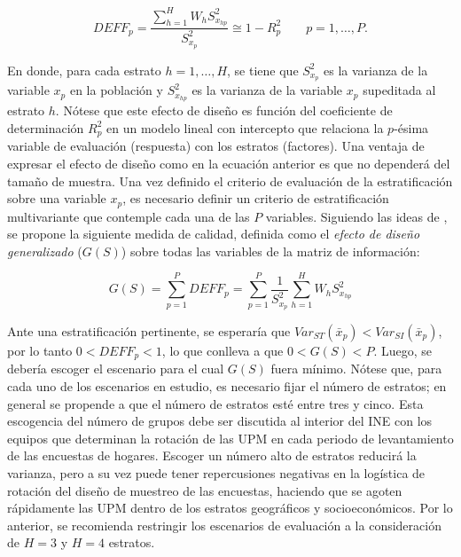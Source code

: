 \documentclass[
  12pt,
  spanish,
]{book}
\begin{document}
\[
DEFF_p = \frac{ \sum_{h=1}^H W_h S^2_{x_{hp}} }{S^2_{x_p}} \cong 1 - R^2_p \ \ \ \ \ \ \ \ \ p = 1, \ldots, P.
\]

En donde, para cada estrato \(h = 1, \ldots, H\), se tiene que \(S^2_{x_p}\) es la varianza de la variable \(x_p\) en la población y \(S^2_{x_{hp}}\) es la varianza de la variable \(x_p\) supeditada al estrato \(h\). Nótese que este efecto de diseño es función del coeficiente de determinación \(R^2_p\) en un modelo lineal con intercepto que relaciona la \(p\)-ésima variable de evaluación (respuesta) con los estratos (factores). Una ventaja de expresar el efecto de diseño como en la ecuación anterior es que no dependerá del tamaño de muestra. Una vez definido el criterio de evaluación de la estratificación sobre una variable \(x_p\), es necesario definir un criterio de estratificación multivariante que contemple cada una de las \(P\) variables. Siguiendo las ideas de \citet{Jarque_1981}, se propone la siguiente medida de calidad, definida como el \emph{efecto de diseño generalizado} (\(G(S)\)) sobre todas las variables de la matriz de información:

\[
G(S) = \sum_{p=1}^P DEFF_p = \sum_{p=1}^P \frac{1}{S^2_{x_p}}\sum_{h=1}^H W_h S^2_{x_{hp}}
\]

Ante una estratificación pertinente, se esperaría que \(Var_{ST}(\bar x _p) < Var_{SI}(\bar x _p)\), por lo tanto \(0 < DEFF_p < 1\), lo que conlleva a que \(0 < G(S) < P\). Luego, se debería escoger el escenario para el cual \(G(S)\) fuera mínimo. Nótese que, para cada uno de los escenarios en estudio, es necesario fijar el número de estratos; en general se propende a que el número de estratos esté entre tres y cinco. Esta escogencia del número de grupos debe ser discutida al interior del INE con los equipos que determinan la rotación de las UPM en cada periodo de levantamiento de las encuestas de hogares. Escoger un número alto de estratos reducirá la varianza, pero a su vez puede tener repercusiones negativas en la logística de rotación del diseño de muestreo de las encuestas, haciendo que se agoten rápidamente las UPM dentro de los estratos geográficos y socioeconómicos. Por lo anterior, se recomienda restringir los escenarios de evaluación a la consideración de \(H=3\) y \(H=4\) estratos.
\end{document}
